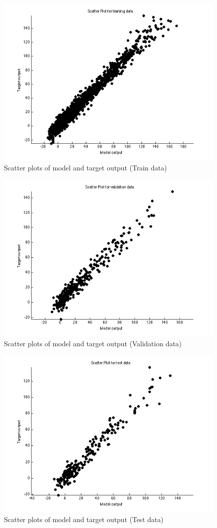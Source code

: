 \documentclass{article}
\begin{document}
\begin{figure}[H]
\centering
\includegraphics[width=0.5\linewidth]{Regression/rbfnn_bivariate/scatter_train.png}
\caption{Scatter plots of model and target output (Train data)}
\end{figure}

\begin{figure}[H]
\centering
\includegraphics[width=0.5\linewidth]{Regression/rbfnn_bivariate/scatter_val.png}
\caption{Scatter plots of model and target output (Validation data)}
\end{figure}

\begin{figure}[H]
\centering
\includegraphics[width=0.5\linewidth]{Regression/rbfnn_bivariate/scatter_test.png}
\caption{Scatter plots of model and target output (Test data)}
\end{figure}



%
%
\end{document}
